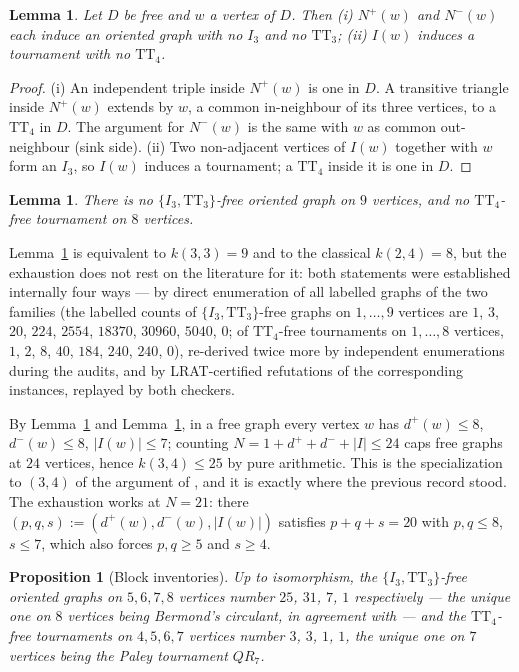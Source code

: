 \documentclass[11pt]{amsart}
\newcommand{\TT}[1]{\mathrm{TT}_{#1}}
\newcommand{\I}[1]{I_{#1}}
\newcommand{\Np}{N^{+}}
\newcommand{\Nm}{N^{-}}
\newcommand{\NI}{I}
\theoremstyle{plain}
\newtheorem{lemma}[theorem]{Lemma}
\newtheorem{proposition}[theorem]{Proposition}
\theoremstyle{definition}
\theoremstyle{remark}
\begin{document}
\begin{lemma}\label{lem:nbhd}
Let $D$ be free and $w$ a vertex of $D$. Then
(i) $\Np(w)$ and $\Nm(w)$ each induce an oriented graph with no $\I3$
and no $\TT{3}$;
(ii) $\NI(w)$ induces a tournament with no $\TT{4}$.
\end{lemma}

\begin{proof}
(i) An independent triple inside $\Np(w)$ is one in $D$. A transitive
triangle inside $\Np(w)$ extends by $w$, a common in-neighbour of its
three vertices, to a $\TT{4}$ in $D$. The argument for $\Nm(w)$ is the
same with $w$ as common out-neighbour (sink side).
(ii) Two non-adjacent vertices of $\NI(w)$ together with $w$ form an
$\I3$, so $\NI(w)$ induces a tournament; a $\TT{4}$ inside it is one in
$D$.
\end{proof}

\begin{lemma}\label{lem:endpoints}
There is no $\{\I3,\TT{3}\}$-free oriented graph on $9$ vertices, and
no $\TT{4}$-free tournament on $8$ vertices.
\end{lemma}

Lemma~\ref{lem:endpoints} is equivalent to $k(3,3)=9$ \cite{Ber74} and
to the classical $k(2,4)=8$, but the exhaustion does not rest on the
literature for it: both statements were established internally four
ways --- by direct enumeration of all labelled graphs of the two
families (the labelled counts of $\{\I3,\TT{3}\}$-free graphs on
$1,\dots,9$ vertices are $1$, $3$, $20$, $224$, $2554$, $18370$,
$30960$, $5040$, $0$; of $\TT{4}$-free tournaments on $1,\dots,8$
vertices, $1$, $2$, $8$, $40$, $184$, $240$, $240$, $0$), re-derived
twice more by independent enumerations during the audits, and by
LRAT-certified refutations of the corresponding instances, replayed by
both checkers.

By Lemma~\ref{lem:nbhd} and Lemma~\ref{lem:endpoints}, in a free graph
every vertex $w$ has $d^+(w)\le 8$, $d^-(w)\le 8$, $|\NI(w)|\le 7$;
counting $N=1+d^++d^-+|\NI|\le 24$ caps free graphs at $24$ vertices,
hence $k(3,4)\le 25$ by pure arithmetic. This is the specialization to
$(3,4)$ of the argument of \cite[Lemma~2.3]{IRW21}, and it is exactly
where the previous record stood. The exhaustion works at $N=21$: there
$(p,q,s):=(d^+(w),d^-(w),|\NI(w)|)$ satisfies $p+q+s=20$ with
$p,q\le 8$, $s\le 7$, which also forces $p,q\ge 5$ and $s\ge 4$.

\begin{proposition}[Block inventories]\label{prop:blocks}
Up to isomorphism, the $\{\I3,\TT{3}\}$-free oriented graphs on
$5,6,7,8$ vertices number $25$, $31$, $7$, $1$ respectively --- the
unique one on $8$ vertices being Bermond's circulant, in agreement with
\cite[Lemma~3.1]{IRW21} ---
and the $\TT{4}$-free tournaments on $4,5,6,7$ vertices number $3$, $3$,
$1$, $1$, the unique one on $7$ vertices being the Paley tournament
$QR_7$.
\end{proposition}
\end{document}
